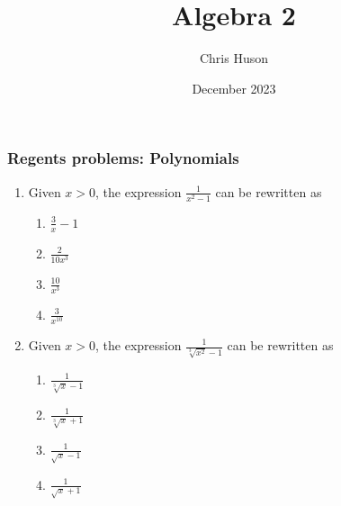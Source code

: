\documentclass[12pt, twoside]{article}
\title{Algebra 2}
\author{Chris Huson}
\date{December 2023}
\begin{document}
\subsubsection*{Regents problems: Polynomials}
\begin{enumerate}[itemsep=0.5cm]
\item Given \(x > 0\), the expression \(\frac{1}{x^2 - 1}\) can be rewritten as
\begin{enumerate}
    \item \(\frac{3}{x} - 1\)
    \item \(\frac{2}{10x^3}\)
    \item \(\frac{10}{x^3}\)
    \item \(\frac{3}{x^{10}}\)
\end{enumerate}

\item Given $x > 0$, the expression $\frac{1}{\sqrt[3]{x^2} - 1}$ can be rewritten as
\begin{enumerate}
    \item $\frac{1}{\sqrt[3]{x} - 1}$
    \item $\frac{1}{\sqrt[3]{x} + 1}$
    \item $\frac{1}{\sqrt{x} - 1}$
    \item $\frac{1}{\sqrt{x} + 1}$
\end{enumerate}


\end{enumerate}
\end{document}
